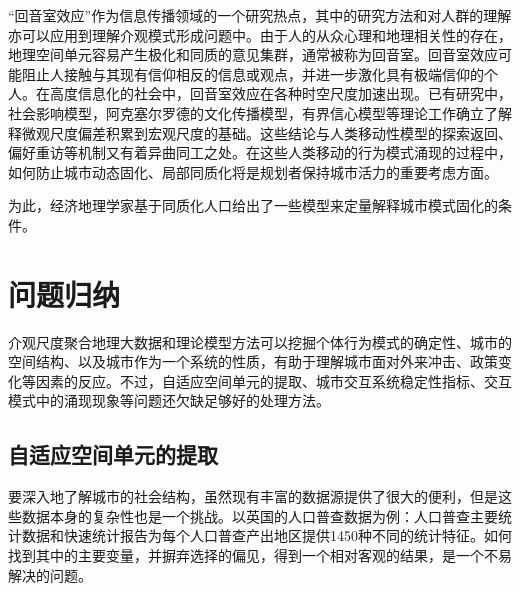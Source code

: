 “回音室效应”\cite{wang2020public, liu2020modeling}作为信息传播领域的一个研究热点，其中的研究方法和对人群的理解亦可以应用到理解介观模式形成问题中。由于人的从众心理和地理相关性的存在，地理空间单元容易产生极化和同质的意见集群，通常被称为回音室。回音室效应可能阻止人接触与其现有信仰相反的信息或观点，并进一步激化具有极端信仰的个人。在高度信息化的社会中，回音室效应在各种时空尺度加速出现\cite{wang2020public}。已有研究中，社会影响模型\cite{noah2006structural, friedkin2011social, parsegov2016novel}，阿克塞尔罗德的文化传播模型\cite{axelrod1997dissemination}，有界信心模型\cite{deffuant2000mixing}等理论工作确立了解释微观尺度偏差积累到宏观尺度的基础。这些结论与人类移动性模型的探索返回、偏好重访等机制又有着异曲同工之处\cite{song2010modelling, gonzalez2008understanding, brockmann2006scaling}。在这些人类移动的行为模式涌现的过程中，如何防止城市动态固化、局部同质化将是规划者保持城市活力的重要考虑方面。

为此，经济地理学家基于同质化人口给出了一些模型来定量解释城市模式固化的条件。%

\section{问题归纳}

介观尺度聚合地理大数据和理论模型方法可以挖掘个体行为模式的确定性、城市的空间结构、以及城市作为一个系统的性质，有助于理解城市面对外来冲击、政策变化等因素的反应。不过，自适应空间单元的提取、城市交互系统稳定性指标、交互模式中的涌现现象等问题还欠缺足够好的处理方法。

\subsection{自适应空间单元的提取}

要深入地了解城市的社会结构，虽然现有丰富的数据源提供了很大的便利，但是这些数据本身的复杂性也是一个挑战。以英国的人口普查数据为例：人口普查主要统计数据和快速统计报告为每个人口普查产出地区提供1450种不同的统计特征。如何找到其中的主要变量，并摒弃选择的偏见，得到一个相对客观的结果，是一个不易解决的问题。